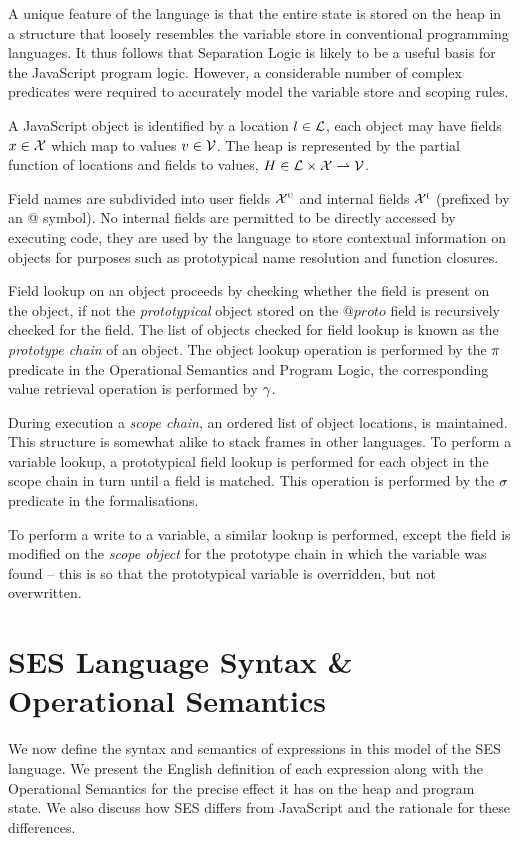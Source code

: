 \documentclass[a4paper,notitlepage]{report}
\begin{document}
  A unique feature of the
  language is that the entire state is stored on the heap in a structure that
  loosely resembles the variable store in conventional programming languages. It
  thus follows that Separation Logic is likely to be a useful basis for the
  JavaScript program logic. However, a considerable number of complex predicates
  were required to accurately model the variable store and scoping rules.


  A JavaScript object is identified by a location $l \in \mathcal{L}$, each object may
  have fields $x \in \mathcal{X}$ which map to values $v \in \mathcal{V}$. The heap is
  represented by the partial function of locations and fields to
  values, $H \in \mathcal{L} \times \mathcal{X} \rightharpoonup \mathcal{V}$.

  Field names are subdivided into user fields $\mathcal{X}^{\textsc{u}}$ and internal fields
  $\mathcal{X}^{\textsc{i}}$ (prefixed by an @ symbol). No internal fields are permitted to be
  directly accessed by executing code, they are used by the language to store
  contextual information on objects for purposes such as prototypical name
  resolution and function closures.

  Field lookup on an object proceeds by checking whether the field is present on
  the object, if not the \emph{prototypical} object stored on the $@proto$ field
  is recursively checked for the field. The list of
  objects checked for field lookup is known as the \emph{prototype chain}
  of an object. The object lookup operation is performed by the $\pi$
  predicate in the Operational Semantics and Program Logic, the corresponding
  value retrieval operation is performed by $\gamma$.

  During execution a \emph{scope chain}, an ordered list of object locations, is
  maintained. This structure is somewhat alike to stack frames in other languages.
  To perform a variable lookup, a prototypical field lookup is performed for
  each object in the scope chain in turn until a field is matched. This
  operation is performed by the $\sigma$ predicate in the formalisations.

  To perform a write to a variable, a similar lookup is performed, except the
  field is modified on the \emph{scope object} for the prototype chain in which the
  variable was found -- this is so that the prototypical variable is overridden,
  but not overwritten.


\chapter{SES Language Syntax \& Operational Semantics}
  We now define the syntax and semantics of expressions in this model of the SES
  language. We present the English definition of each expression along with the
  Operational Semantics for the precise effect it has on the heap and program
  state. We also discuss how SES differs from JavaScript and the rationale for
  these differences.
\end{document}
